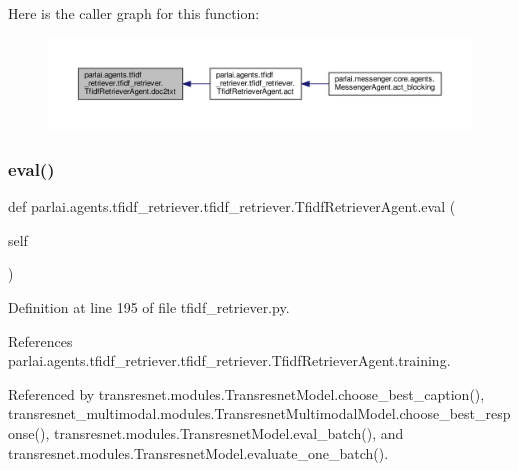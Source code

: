 Here is the caller graph for this function\+:
\nopagebreak
\begin{figure}[H]
\begin{center}
\leavevmode
\includegraphics[width=350pt]{classparlai_1_1agents_1_1tfidf__retriever_1_1tfidf__retriever_1_1TfidfRetrieverAgent_af3dec5fd8d3fb89229f00d919bfcd565_icgraph}
\end{center}
\end{figure}
\mbox{\label{classparlai_1_1agents_1_1tfidf__retriever_1_1tfidf__retriever_1_1TfidfRetrieverAgent_a97a3e0824539ff7df230ccaee5cdda20}} 
\subsubsection{\texorpdfstring{eval()}{eval()}}
{\footnotesize\ttfamily def parlai.\+agents.\+tfidf\+\_\+retriever.\+tfidf\+\_\+retriever.\+Tfidf\+Retriever\+Agent.\+eval (\begin{DoxyParamCaption}\item[{}]{self }\end{DoxyParamCaption})}



Definition at line 195 of file tfidf\+\_\+retriever.\+py.



References parlai.\+agents.\+tfidf\+\_\+retriever.\+tfidf\+\_\+retriever.\+Tfidf\+Retriever\+Agent.\+training.



Referenced by transresnet.\+modules.\+Transresnet\+Model.\+choose\+\_\+best\+\_\+caption(), transresnet\+\_\+multimodal.\+modules.\+Transresnet\+Multimodal\+Model.\+choose\+\_\+best\+\_\+response(), transresnet.\+modules.\+Transresnet\+Model.\+eval\+\_\+batch(), and transresnet.\+modules.\+Transresnet\+Model.\+evaluate\+\_\+one\+\_\+batch().

